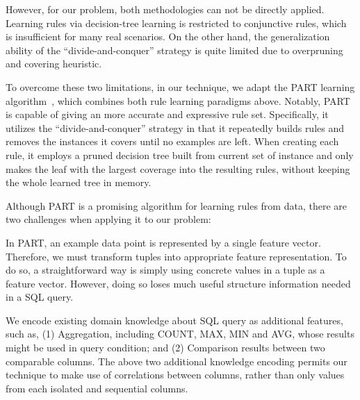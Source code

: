 \vspace{1mm}

However, for our problem, both methodologies can not be directly applied.
Learning rules via decision-tree learning is restricted to conjunctive rules,
which is insufficient for many real scenarios. On the
other hand, the generalization ability of the ``divide-and-conquer'' strategy
is quite limited due to overpruning and covering heuristic.

To overcome these two limitations, in our technique, we adapt
the PART learning algorithm~\cite{Frank:1998}, which combines both
rule learning paradigms above. Notably, PART is capable of giving an more
accurate and expressive rule set. Specifically, it utilizes the
``divide-and-conquer'' strategy in that it repeatedly builds rules
and removes the instances it covers until no examples are left.
When creating each rule, it employs a pruned decision tree built from
current set of instance and only makes the leaf with the largest coverage
into the resulting rules, without keeping the whole learned tree in memory.



Although PART is a promising algorithm for learning rules from data,
there are two challenges when applying it to our problem:


\vspace{1mm}
In PART, an example data point is represented by a single feature vector.
Therefore, we must transform tuples into appropriate feature representation.
To do so, a straightforward way is simply using concrete values in a tuple
as a feature vector. However, doing so loses much useful structure information
needed in a SQL query.

\vspace{1mm}
We encode existing domain knowledge about SQL query as additional
features, such as, (1) Aggregation, including \textsf{COUNT}, \textsf{MAX},
\textsf{MIN} and \textsf{AVG}, whose results might be used in query condition;
and (2) Comparison results between two comparable columns.
The above two additional knowledge encoding permits our technique
to make use of correlations between columns, rather than only values
from each isolated and sequential columns.

